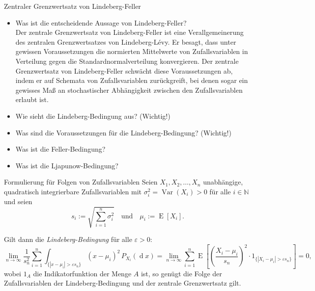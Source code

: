 \begin{info}{Zentraler Grenzwertsatz von Lindeberg-Feller}
    \begin{itemize}
        \item Was ist die entscheidende Aussage von Lindeberg-Feller? \\
              Der zentrale Grenzwertsatz von Lindeberg-Feller ist eine Verallgemeinerung des zentralen Grenzwertsatzes von Lindeberg-Lévy.
              Er besagt, dass unter gewissen Voraussetzungen die normierten Mittelwerte von Zufallsvariablen in Verteilung gegen die Standardnormalverteilung konvergieren.
              Der zentrale Grenzwertsatz von Lindeberg-Feller schwächt diese Voraussetzungen ab, indem er auf Schemata von Zufallsvariablen zurückgreift, bei denen sogar ein gewisses Maß an stochastischer Abhängigkeit zwischen den Zufallsvariablen erlaubt ist.
        \item Wie sieht die Lindeberg-Bedingung aus? (Wichtig!)
        \item Was sind die Voraussetzungen für die Lindeberg-Bedingung? (Wichtig!)
        \item Was ist die Feller-Bedingung?
        \item Was ist die Ljapunow-Bedingung?
    \end{itemize}
\end{info}

\begin{defi}{Formulierung für Folgen von Zufallsvariablen}
    Seien $X_{1},X_{2},\ldots ,X_{n}$ unabhängige, quadratisch integrierbare Zufallsvariablen mit $\sigma _{i}^{2}=\operatorname {Var} (X_{i})>0$ für alle $i \in \mathbb{N}$ und seien
    \[
        s_i := \sqrt{\sum _{i=1}^{n}\sigma _{i}^{2}} \quad \text{und} \quad \mu_{i} := \operatorname{E} [X_{i}].
    \]

    Gilt dann die \emph{Lindeberg-Bedingung} für alle $\varepsilon > 0$:
    \[
        \lim_{n \to \infty} \frac{1}{s_n^2} \sum_{i=1}^{n} \int_{\{|x-\mu_i| > \varepsilon s_n\}} (x-\mu_i)^2 \, P_{X_i}(\operatorname{d} x) = \lim_{n \to \infty} \sum_{i=1}^{n} \operatorname{E} \left[ \left( \frac{X_i - \mu_i}{s_n} \right)^2 \cdot 1_{\{|X_i - \mu_i| > \varepsilon s_n\}} \right] = 0,
    \]
    wobei $1_{A}$ die Indikatorfunktion der Menge $A$ ist, so genügt die Folge der Zufallsvariablen der Lindeberg-Bedingung und der zentrale Grenzwertsatz gilt.
\end{defi}

